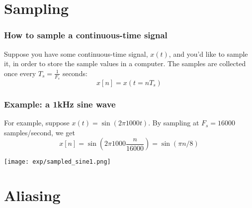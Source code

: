 \documentclass{beamer}
\begin{document}
\section[Sampling]{Sampling}
\setcounter{subsection}{1}

\begin{frame}
  \frametitle{How to sample a continuous-time signal}

  Suppose you have some continuous-time signal, $x(t)$, and you'd like
  to sample it, in order to store the sample values in a computer.
  The samples are collected once every $T_s=\frac{1}{F_s}$ seconds:
  \begin{displaymath}
    x[n] = x(t=nT_s)
  \end{displaymath}
\end{frame}

\begin{frame}
  \frametitle{Example: a 1kHz sine wave}

  For example, suppose $x(t)=\sin(2\pi 1000t)$.  By sampling at
  $F_s=16000$ samples/second, we get
  \begin{displaymath}
    x[n] = \sin\left(2\pi 1000\frac{n}{16000}\right) = \sin(\pi n/8)
  \end{displaymath}
  
  \centerline{\texttt{[image: exp/sampled\_sine1.png]}}
\end{frame}

\section[Aliasing]{Aliasing}
\setcounter{subsection}{1}
\end{document}
